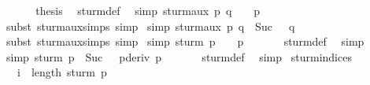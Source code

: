 \begin{isabellebody}
\ \ \isacommand{{\isacharbraceright}}\isamarkupfalse%
\isanewline
\ \ \isamarkupfalse%
\ {\isacharquery}thesis\ \isamarkupfalse%
\ sturm{\isacharunderscore}def\ \isacommand{{\isachardot}}\isamarkupfalse%
\isanewline
{}\isamarkupfalse%
%
\endisatagproof
{\isafoldproof}%
%
\isadelimproof
\isanewline
%
\endisadelimproof
\isanewline
{}\isamarkupfalse%
\ {\isacharbrackleft}simp{\isacharbrackright}{\isacharcolon}\ {\isachardoublequoteopen}sturm{\isacharunderscore}aux\ p\ q\ {\isacharbang}\ {}\ {\isacharequal}\ p{\isachardoublequoteclose}\isanewline
%
\isadelimproof
\ \ \ \ %
\endisadelimproof
%
\isatagproof
{}\isamarkupfalse%
\ {\isacharparenleft}subst\ sturm{\isacharunderscore}aux{\isachardot}simps{\isacharcomma}\ simp{\isacharparenright}%
\endisatagproof
{\isafoldproof}%
%
\isadelimproof
\isanewline
%
\endisadelimproof
{}\isamarkupfalse%
\ {\isacharbrackleft}simp{\isacharbrackright}{\isacharcolon}\ {\isachardoublequoteopen}sturm{\isacharunderscore}aux\ p\ q\ {\isacharbang}\ Suc\ {}\ {\isacharequal}\ q{\isachardoublequoteclose}\isanewline
%
\isadelimproof
\ \ \ \ %
\endisadelimproof
%
\isatagproof
{}\isamarkupfalse%
\ {\isacharparenleft}subst\ sturm{\isacharunderscore}aux{\isachardot}simps{\isacharcomma}\ simp{\isacharparenright}%
\endisatagproof
{\isafoldproof}%
%
\isadelimproof
\isanewline
%
\endisadelimproof
\isanewline
{}\isamarkupfalse%
\ {\isacharbrackleft}simp{\isacharbrackright}{\isacharcolon}\ {\isachardoublequoteopen}sturm\ p\ {\isacharbang}\ {}\ {\isacharequal}\ p{\isachardoublequoteclose}\ \isanewline
%
\isadelimproof
\ \ \ \ %
\endisadelimproof
%
\isatagproof
{}\isamarkupfalse%
\ sturm{\isacharunderscore}def\ \isamarkupfalse%
\ simp%
\endisatagproof
{\isafoldproof}%
%
\isadelimproof
\isanewline
%
\endisadelimproof
{}\isamarkupfalse%
\ {\isacharbrackleft}simp{\isacharbrackright}{\isacharcolon}\ {\isachardoublequoteopen}sturm\ p\ {\isacharbang}\ Suc\ {}\ {\isacharequal}\ pderiv\ p{\isachardoublequoteclose}\ \isanewline
%
\isadelimproof
\ \ \ \ %
\endisadelimproof
%
\isatagproof
{}\isamarkupfalse%
\ sturm{\isacharunderscore}def\ \isamarkupfalse%
\ simp%
\endisatagproof
{\isafoldproof}%
%
\isadelimproof
\isanewline
%
\endisadelimproof
\isanewline
{}\isamarkupfalse%
\ sturm{\isacharunderscore}indices{\isacharcolon}\isanewline
\ \ \ {\isachardoublequoteopen}i\ {\isacharless}\ length\ {\isacharparenleft}sturm\ p{\isacharparenright}\ {\isacharminus}\ {}{\isachardoublequoteclose}\isanewline

\end{isabellebody}
